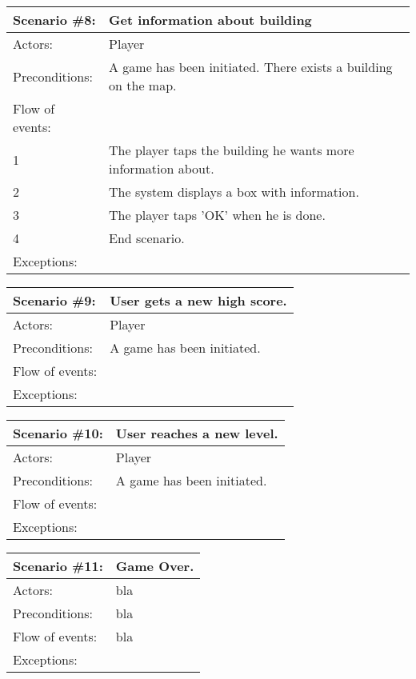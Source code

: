 \begin{tabular}{| l | p{10cm} |}
	\hline
	{\bf Scenario \#8:} & {\bf Get information about building} \\ \hline
	Actors: & Player \\ \hline
	Preconditions: & A game has been initiated. There exists a building on the map. \\ \hline
	Flow of events: & \\ \hline
	1 & The player taps the building he wants more information about. \\ \hline
	2 & The system displays a box with information. \\ \hline
	3 & The player taps 'OK' when he is done. \\ \hline
	4 & End scenario. \\ \hline
	Exceptions: & \\ \hline
\end{tabular}

\begin{tabular}{| l | p{10cm} |}
	\hline
	{\bf Scenario \#9:} & {\bf User gets a new high score.} \\ \hline
	Actors: & Player \\ \hline
	Preconditions: & A game has been initiated. \\ \hline
	Flow of events: & \\ \hline
	Exceptions: & \\ \hline
\end{tabular}

\begin{tabular}{| l | p{10cm} |}
	\hline
	{\bf Scenario \#10:} & {\bf User reaches a new level.} \\ \hline
	Actors: & Player \\ \hline
	Preconditions: & A game has been initiated. \\ \hline
	Flow of events: & \\ \hline
	Exceptions: & \\ \hline
\end{tabular}

\begin{tabular}{| l | p{10cm} |}
	\hline
	{\bf Scenario \#11:} & {\bf Game Over.} \\ \hline
	Actors: & bla \\ \hline
	Preconditions: & bla \\ \hline
	Flow of events: & bla \\ \hline
	Exceptions: \\ \hline
\end{tabular}

